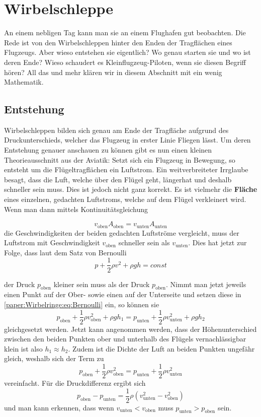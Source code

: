 %
%
%
\section{Wirbelschleppe}
An einem nebligen Tag kann man sie an einem Flughafen gut beobachten. 
Die Rede ist von den Wirbelschleppen hinter den Enden der Tragflächen eines Flugzeugs.
Aber wieso entstehen sie eigentlich? 
Wo genau starten sie und wo ist deren Ende?
Wieso schaudert es Kleinflugzeug-Piloten, wenn sie diesen Begriff hören?
All das und mehr klären wir in diesem Abschnitt mit ein wenig Mathematik.

\subsection{Entstehung}
Wirbelschleppen bilden sich genau am Ende der Tragfläche aufgrund des Druckunterschieds, welcher das Flugzeug in erster Linie Fliegen lässt.
Um deren Entstehung genauer anschauen zu können gibt es nun einen kleinen Theorieausschnitt aus der Aviatik:
Setzt sich ein Flugzeug in Bewegung, so entsteht um die Flügeltragflächen ein Luftstrom.
Ein weitverbreiteter Irrglaube besagt, dass die Luft, welche über den Flügel geht, \glqq länger\grqq hat und deshalb schneller sein muss.
Dies ist jedoch nicht ganz korrekt.
Es ist vielmehr die \textbf{Fläche} eines einzelnen, gedachten Luftstroms, welche auf dem Flügel verkleinert wird.%
Wenn man dann mittels Kontinuitätsgleichung

\[
v_{\text{oben}}A_{\text{oben}} 
=
v_{\text{unten}}A_{\text{unten}}
\]
die Geschwindigkeiten der beiden gedachten Luftströme vergleicht, muss der Luftstrom mit Geschwindigkeit $v_{\text{oben}}$ schneller sein als $v_{\text{unten}}$.
Dies hat jetzt zur Folge, dass laut dem Satz von Bernoulli 
\begin{equation}
    p+\frac{1}{2}\rho v^2+\rho gh
    =
    const
    \label{paper:Wirbelringe:eq:Bernoulli}
\end{equation}

der Druck $p_{\text{oben}}$ kleiner sein muss als der Druck $p_{\text{oben}}$.
Nimmt man jetzt jeweils einen Punkt auf der Ober- sowie einen auf der Unterseite und setzen diese in \ref{paper:Wirbelringe:eq:Bernoulli} ein, so können sie 
\[
p_{\text{oben}}+\frac{1}{2}\rho v^2_{\text{oben}} + \rho gh_1 
=
p_{\text{unten}}+\frac{1}{2}\rho v^2_{\text{unten}}+\rho gh_2
\]
gleichgesetzt werden.
Jetzt kann angenommen werden, dass der Höhenunterschied zwischen den beiden Punkten ober und unterhalb des Flügels vernachlässigbar klein ist also \(h_1\approx h_2\).
Zudem ist die Dichte der Luft an beiden Punkten ungefähr gleich, weshalb sich der Term zu 
\[
p_{\text{oben}}+\frac{1}{2}\rho v^2_{\text{oben}} 
=
p_{\text{unten}}+\frac{1}{2}\rho v^2_{\text{unten}}
\]
vereinfacht.
Für die Druckdifferenz ergibt sich
\[
p_{\text{oben}}-p_{\text{unten}} 
=
\frac{1}{2}\rho( v^2_{\text{unten}}-v^2_{\text{oben}})
\]
und man kann erkennen, dass wenn $v_{\text{unten}} < v_{\text{oben}}$ muss $p_{\text{unten}} > p_{\text{oben}}$ sein.

